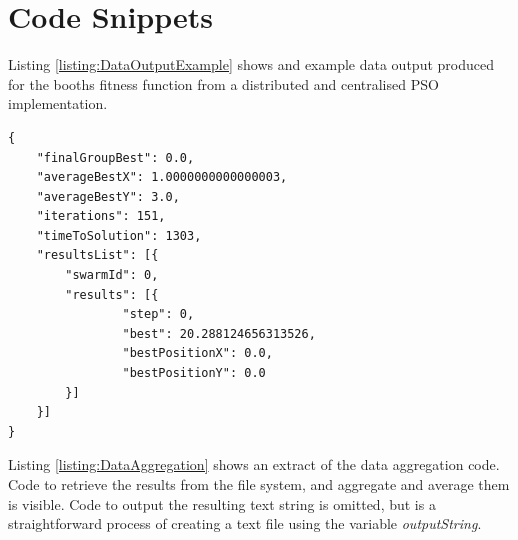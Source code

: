 \documentclass[oneside,12pt]{book}
\begin{document}


\appendix
\chapter{Code Snippets}
Listing \ref{listing:DataOutputExample} shows and example data output produced for the booths fitness function from a distributed and centralised PSO implementation. 
\begin{lstlisting}
{
	"finalGroupBest": 0.0,
	"averageBestX": 1.0000000000000003,
	"averageBestY": 3.0,
	"iterations": 151,
	"timeToSolution": 1303,
	"resultsList": [{
		"swarmId": 0,
		"results": [{
				"step": 0,
				"best": 20.288124656313526,
				"bestPositionX": 0.0,
				"bestPositionY": 0.0
		}]
	}]
}
\end{lstlisting}
\label{listing:DataOutputExample}

Listing \ref{listing:DataAggregation} shows an extract of the data aggregation code. Code to retrieve the results from the file system, and aggregate and average them is visible. Code to output the resulting text string is omitted, but is a straightforward process of creating a text file using the variable \textit{outputString}.
\end{document}
